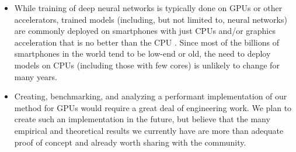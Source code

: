 \begin{itemize}
    \item While training of deep neural networks is typically done on GPUs or other accelerators, trained models (including, but not limited to, neural networks) are commonly deployed on smartphones with just CPUs and/or graphics acceleration that is no better than the CPU \cite{fbAtEdge}. Since most of the billions of smartphones in the world tend to be low-end or old, the need to deploy models on CPUs (including those with few cores) is unlikely to change for many years.
    \item Creating, benchmarking, and analyzing a performant implementation of our method for GPUs would require a great deal of engineering work. We plan to create such an implementation in the future, but believe that the many empirical and theoretical results we currently have are more than adequate proof
    of concept and already worth sharing with the community. %

\end{itemize}
